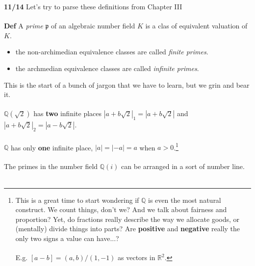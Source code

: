 \documentclass[12pt]{article}
\begin{document}
\newpage

\noindent \textbf{11/14}  Let's try to parse these definitions from Chapter III \\ \\
\textbf{Def} A \textit{prime}  $\mathfrak{p}$ of an algebraic number field $K$ is a clas of equivalent valuation of $K$. 
\begin{itemize}
\item the non-archimedian equivalence classes are called \textit{finite primes}.
\item the archmedian equivalence classes are called \textit{infinite primes}.
\end{itemize}
This is the start of a bunch of jargon that we have to learn, but we grin and bear it. \\ \\
$\mathbb{Q}(\sqrt{2})$ has {\color{green!75!black} \textbf{two}} infinite places $|a+b\sqrt{2}|_1 = |a + b \sqrt{2}|$ and $|a+b\sqrt{2}|_2 = |a - b \sqrt{2}|$.  \\ \\
$\mathbb{Q}$ has only \textbf{one} infinite place, $|a|= |-a| = a$ when $a > 0$.\footnote{This is a great time to start wondering if $\mathbb{Q}$ is even the most natural construct.  We count things, don't we?  And we talk about fairness and proportion?  Yet, do fractions really describe the way we allocate goods, or (mentally) divide things into parts?  Are \textbf{positive} and \textbf{negative} really the only two signs a value can have...? \\ \\
E.g. $[a-b] = (a,b)/(1,-1)$ as vectors in $\mathbb{R}^2$.} \\ \\
The primes in the number field $\mathbb{Q}(i)$ can be arranged in a sort of number line.\\ \\
\end{document}
